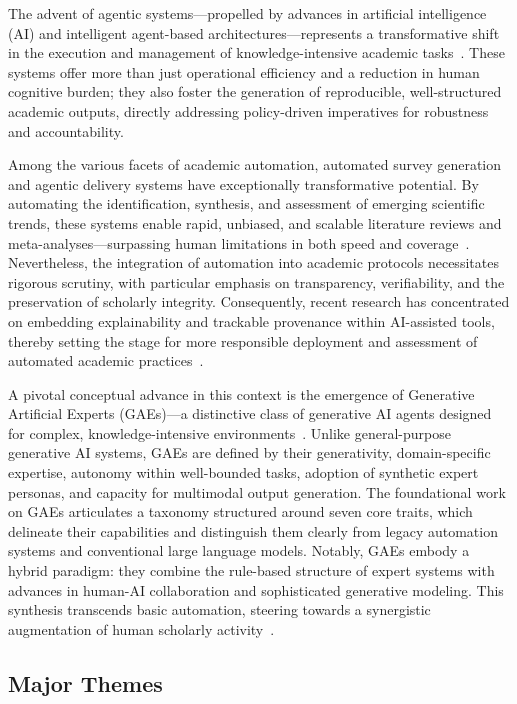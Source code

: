 \documentclass[sigconf]{acmart}
\begin{document}
The advent of agentic systems---propelled by advances in artificial intelligence (AI) and intelligent agent-based architectures---represents a transformative shift in the execution and management of knowledge-intensive academic tasks~\cite{ref16,ref106,ref111}. These systems offer more than just operational efficiency and a reduction in human cognitive burden; they also foster the generation of reproducible, well-structured academic outputs, directly addressing policy-driven imperatives for robustness and accountability.

Among the various facets of academic automation, automated survey generation and agentic delivery systems have exceptionally transformative potential. By automating the identification, synthesis, and assessment of emerging scientific trends, these systems enable rapid, unbiased, and scalable literature reviews and meta-analyses---surpassing human limitations in both speed and coverage~\cite{ref106,ref111}. Nevertheless, the integration of automation into academic protocols necessitates rigorous scrutiny, with particular emphasis on transparency, verifiability, and the preservation of scholarly integrity. Consequently, recent research has concentrated on embedding explainability and trackable provenance within AI-assisted tools, thereby setting the stage for more responsible deployment and assessment of automated academic practices~\cite{ref101,ref102,ref103,ref104,ref105,ref106}.

A pivotal conceptual advance in this context is the emergence of Generative Artificial Experts (GAEs)---a distinctive class of generative AI agents designed for complex, knowledge-intensive environments~\cite{ref16}. Unlike general-purpose generative AI systems, GAEs are defined by their generativity, domain-specific expertise, autonomy within well-bounded tasks, adoption of synthetic expert personas, and capacity for multimodal output generation. The foundational work on GAEs articulates a taxonomy structured around seven core traits, which delineate their capabilities and distinguish them clearly from legacy automation systems and conventional large language models. Notably, GAEs embody a hybrid paradigm: they combine the rule-based structure of expert systems with advances in human-AI collaboration and sophisticated generative modeling. This synthesis transcends basic automation, steering towards a synergistic augmentation of human scholarly activity~\cite{ref16}.

\subsection{Major Themes}
\end{document}
